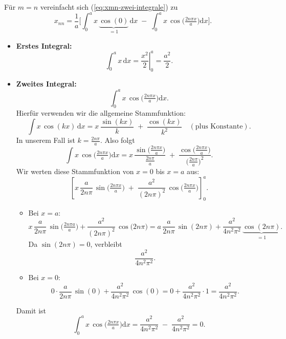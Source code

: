 \documentclass{scrartcl}
\begin{document}
Für \(m = n\) vereinfacht sich (\ref{eq:xmn-zwei-integrale}) zu
\[
x_{nn} 
= \frac{1}{a}\Biggl[
\int_{0}^{a} x\,\underbrace{\cos(0)}_{=1}\,\mathrm{d}x
\;-\;
\int_{0}^{a} x\,\cos\!\bigl(\tfrac{2n\pi x}{a}\bigr)\mathrm{d}x
\Biggr].
\]
\begin{itemize}
  \item[\textbullet] \textbf{Erstes Integral:}
  \[
  \int_{0}^{a} x\,\mathrm{d}x 
  = \left.\frac{x^{2}}{2}\right|_{0}^{a} 
  = \frac{a^{2}}{2}.
  \]

  \item[\textbullet] \textbf{Zweites Integral:}
  \[
  \int_{0}^{a} x\,\cos\!\bigl(\tfrac{2n\pi x}{a}\bigr)\mathrm{d}x.
  \]
  Hierfür verwenden wir die allgemeine Stammfunktion:
  \[
  \int x\,\cos(kx)\,\mathrm{d}x 
  = x\,\frac{\sin(kx)}{k} \;+\; \frac{\cos(kx)}{k^{2}} 
  \quad(\text{plus Konstante}).
  \]
  In unserem Fall ist \(k = \tfrac{2n\pi}{a}\). Also folgt
  \[
  \int x\,\cos\!\bigl(\tfrac{2n\pi x}{a}\bigr)\mathrm{d}x
  = x\,\frac{\sin\bigl(\tfrac{2n\pi x}{a}\bigr)}{\tfrac{2n\pi}{a}}
  \;+\; \frac{\cos\bigl(\tfrac{2n\pi x}{a}\bigr)}{\bigl(\tfrac{2n\pi}{a}\bigr)^{2}}.
  \]
  Wir werten diese Stammfunktion von \(x=0\) bis \(x=a\) aus:
  \[
  \left[x\,\frac{a}{2n\pi}\,\sin\!\bigl(\tfrac{2n\pi x}{a}\bigr)
  \;+\;
  \frac{a^{2}}{(2n\pi)^{2}}\,\cos\!\bigl(\tfrac{2n\pi x}{a}\bigr)\right]_{0}^{a}.
  \]
  \begin{itemize}
    \item Bei \(x = a\):
    \[
    x\,\frac{a}{2n\pi}\,\sin\!\bigl(\tfrac{2n\pi a}{a}\bigr)
    + \frac{a^{2}}{(2n\pi)^{2}}\,\cos\!\bigl(2n\pi\bigr)
    = a\,\frac{a}{2n\pi}\,\sin(2n\pi) 
    + \frac{a^{2}}{4n^{2}\pi^{2}}\,\underbrace{\cos(2n\pi)}_{=1}.
    \]
    Da \(\sin(2n\pi)=0\), verbleibt
    \[
    \frac{a^{2}}{4n^{2}\pi^{2}}.
    \]
    \item Bei \(x = 0\):
    \[
    0\cdot\frac{a}{2n\pi}\,\sin(0) 
    + \frac{a^{2}}{4n^{2}\pi^{2}}\,\cos(0)
    = 0 + \frac{a^{2}}{4n^{2}\pi^{2}}\cdot 1 
    = \frac{a^{2}}{4n^{2}\pi^{2}}.
    \]
  \end{itemize}
  Damit ist
  \[
  \int_{0}^{a} x\,\cos\!\bigl(\tfrac{2n\pi x}{a}\bigr)\mathrm{d}x
  = \frac{a^{2}}{4n^{2}\pi^{2}} \;-\; \frac{a^{2}}{4n^{2}\pi^{2}} 
  = 0.
  \]
\end{itemize}
\end{document}
